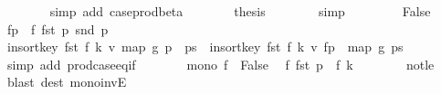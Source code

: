 \begin{isabellebody}
\ \ \ \ \ \ \isamarkupfalse%
\ {\isacharparenleft}{\kern0pt}simp\ add{\isacharcolon}{\kern0pt}\ case{\isacharunderscore}{\kern0pt}prod{\isacharunderscore}{\kern0pt}beta{\isacharprime}{\kern0pt}{\isacharparenright}{\kern0pt}\isanewline
\ \ \ \ \isamarkupfalse%
\ \isamarkupfalse%
\ {\isacharquery}{\kern0pt}thesis\isanewline
\ \ \ \ \ \ \isamarkupfalse%
\ simp\isanewline
\ \ \isamarkupfalse%
\isanewline
\ \ \ \ \isamarkupfalse%
\ False\isanewline
\ \ \ \ \isamarkupfalse%
\ {\isacharquery}{\kern0pt}f{\isacharunderscore}{\kern0pt}p\ {\isacharequal}{\kern0pt}\ {\isachardoublequoteopen}{\isacharparenleft}{\kern0pt}f\ {\isacharparenleft}{\kern0pt}fst\ p{\isacharparenright}{\kern0pt}{\isacharcomma}{\kern0pt}\ snd\ p{\isacharparenright}{\kern0pt}{\isachardoublequoteclose}\isanewline
\ \ \ \ \isamarkupfalse%
\ {\isachardoublequoteopen}insort{\isacharunderscore}{\kern0pt}key\ fst\ {\isacharparenleft}{\kern0pt}f\ k{\isacharcomma}{\kern0pt}\ v{\isacharparenright}{\kern0pt}\ {\isacharparenleft}{\kern0pt}map\ {\isacharquery}{\kern0pt}g\ {\isacharparenleft}{\kern0pt}p\ {\isacharhash}{\kern0pt}\ ps{\isacharparenright}{\kern0pt}{\isacharparenright}{\kern0pt}\ {\isacharequal}{\kern0pt}\ insort{\isacharunderscore}{\kern0pt}key\ fst\ {\isacharparenleft}{\kern0pt}f\ k{\isacharcomma}{\kern0pt}\ v{\isacharparenright}{\kern0pt}\ {\isacharparenleft}{\kern0pt}{\isacharquery}{\kern0pt}f{\isacharunderscore}{\kern0pt}p\ {\isacharhash}{\kern0pt}\ map\ {\isacharquery}{\kern0pt}g\ ps{\isacharparenright}{\kern0pt}{\isachardoublequoteclose}\isanewline
\ \ \ \ \ \ \isamarkupfalse%
\ {\isacharparenleft}{\kern0pt}simp\ add{\isacharcolon}{\kern0pt}\ prod{\isachardot}{\kern0pt}case{\isacharunderscore}{\kern0pt}eq{\isacharunderscore}{\kern0pt}if{\isacharparenright}{\kern0pt}\isanewline
\ \ \ \ \isamarkupfalse%
\ \isamarkupfalse%
\ {\isacartoucheopen}mono\ f{\isacartoucheclose}\ \ False\ \isamarkupfalse%
\ {\isachardoublequoteopen}f\ {\isacharparenleft}{\kern0pt}fst\ p{\isacharparenright}{\kern0pt}\ {\isasymle}\ f\ k{\isachardoublequoteclose}\isanewline
\ \ \ \ \ \ \isamarkupfalse%
\ not{\isacharunderscore}{\kern0pt}le\ \isamarkupfalse%
\ {\isacharparenleft}{\kern0pt}blast\ dest{\isacharcolon}{\kern0pt}\ mono{\isacharunderscore}{\kern0pt}invE{\isacharparenright}{\kern0pt}\isanewline
\ \ \ \ \isamarkupfalse%
\ \isamarkupfalse%

\end{isabellebody}
